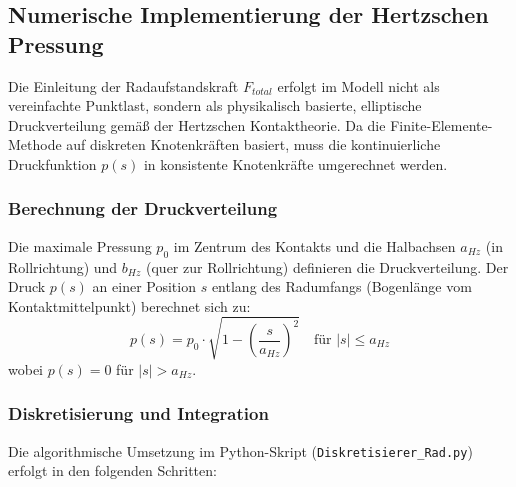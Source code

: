 \subsection{Numerische Implementierung der Hertzschen Pressung}

Die Einleitung der Radaufstandskraft $F_{total}$ erfolgt im Modell nicht als vereinfachte Punktlast, sondern als physikalisch basierte, elliptische Druckverteilung gemäß der Hertzschen Kontaktheorie. Da die Finite-Elemente-Methode auf diskreten Knotenkräften basiert, muss die kontinuierliche Druckfunktion $p(s)$ in konsistente Knotenkräfte umgerechnet werden.

\subsubsection{Berechnung der Druckverteilung}
Die maximale Pressung $p_0$ im Zentrum des Kontakts und die Halbachsen $a_{Hz}$ (in Rollrichtung) und $b_{Hz}$ (quer zur Rollrichtung) definieren die Druckverteilung. Der Druck $p(s)$ an einer Position $s$ entlang des Radumfangs (Bogenlänge vom Kontaktmittelpunkt) berechnet sich zu:
\begin{equation}
    p(s) = p_0 \cdot \sqrt{1 - \left(\frac{s}{a_{Hz}}\right)^2} \quad \text{für } |s| \le a_{Hz}
\end{equation}
wobei $p(s) = 0$ für $|s| > a_{Hz}$.

\subsubsection{Diskretisierung und Integration}
Die algorithmische Umsetzung im Python-Skript (\texttt{Diskretisierer\_Rad.py}) erfolgt in den folgenden Schritten:

